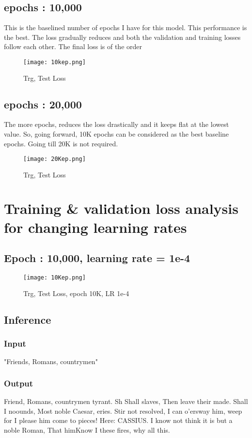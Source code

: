 \documentclass[conference]{IEEEtran}
\begin{document}
\subsection{epochs : 10,000}
This is the baselined number of epochs I have for this model. This performance is the best. The loss gradually reduces and both the validation and training losses follow each other. The final loss is of the order 
\begin{figure}[H]
    \centering
    \texttt{[image: 10kep.png]}
    \caption{Trg, Test Loss}
    \label{fig:epoch10000}
\end{figure}

\subsection{epochs : 20,000}
The more epochs, reduces the loss drastically and it keeps flat at the lowest value. So, going forward, 10K epochs can be considered as the best baseline epochs. Going till 20K is not required.
\begin{figure}[H]
    \centering
    \texttt{[image: 20Kep.png]}
    \caption{Trg, Test Loss}
    \label{fig:epoch20000}
\end{figure}

\section{Training & validation loss analysis for changing learning rates}
\subsection{Epoch : 10,000, learning rate = 1e-4}
\begin{figure}[H]
    \centering
    \texttt{[image: 10Kep.png]}
    \caption{Trg, Test Loss, epoch 10K, LR 1e-4}
    \label{fig:epoch}
\end{figure}
\subsection{Inference}
\subsubsection{Input}
"Friends, Romans, countrymen"
\subsubsection{Output}
Friend, Romans, countrymen tyrant. Sh Shall slaves, Then leave their made. Shall I noounds, Most noble Caesar, eries. Stir not resolved,
I can o’ersway him, weep for I please him come to pieces! Here:
CASSIUS.
I know not think it is but a noble Roman, That himKnow I these fires, why all this.
\end{document}
